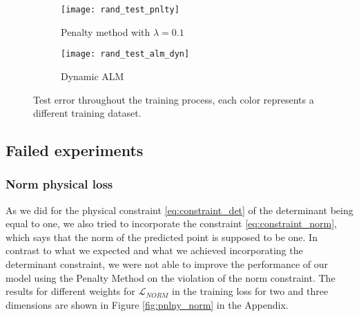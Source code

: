 \begin{figure}
	\centering
	\begin{subfigure}{.5\textwidth}
		\centering
		\texttt{[image: rand\_test\_pnlty]}
		\caption{Penalty method with $\lambda = 0.1$}
	\end{subfigure}%
	\begin{subfigure}{.5\textwidth}
		\centering
		\texttt{[image: rand\_test\_alm\_dyn]}
		\caption{Dynamic ALM}
	\end{subfigure}
	\caption{Test error throughout the training process, each color represents a different training dataset.}
	\label{fig:test_training}
\end{figure}






\subsection{Failed experiments}

\subsubsection{Norm physical loss}
As we did for the physical constraint \ref{eq:constraint_det} of the determinant being equal to one, we also tried to incorporate the constraint \ref{eq:constraint_norm}, which says that the norm of the predicted point is supposed to be one. In contrast to what we expected and what we achieved incorporating the determinant constraint, we were not able to improve the performance of our model using the Penalty Method on the violation of the norm constraint. The results for different weights for $\mathcal{L}_{NORM}$ in the training loss for two and three dimensions are shown in Figure \ref{fig:pnlny_norm} in the Appendix.

